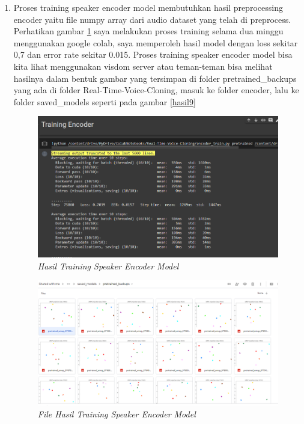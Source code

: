 \begin{enumerate}
\item Proses training speaker encoder model membutuhkan hasil preprocessing encoder yaitu file numpy array dari audio dataset yang telah di preprocess. Perhatikan gambar \ref{hasil8} saya melakukan proses training selama dua minggu menggunakan google colab, saya memperoleh hasil model dengan loss sekitar 0,7 dan error rate sekitar 0.015. Proses training speaker encoder model bisa kita lihat menggunakan visdom server atau teman-teman bisa melihat hasilnya dalam bentuk gambar yang tersimpan di folder pretrained\_backups yang ada di folder Real-Time-Voice-Cloning, masuk ke folder encoder, lalu ke folder saved\_models seperti pada gambar \ref{hasil9}

\begin{figure}[H]
    \centering
    \includegraphics[scale=0.5]{figures/hasil8}
    \caption{\textit{Hasil Training Speaker Encoder Model}}
    \label{hasil8}
\end{figure}

\begin{figure}[H]
    \centering
    \includegraphics[scale=0.4]{figures/hasil10}
    \caption{\textit{File Hasil Training Speaker Encoder Model}}
    \label{hasil10}
\end{figure}


\end{enumerate}
